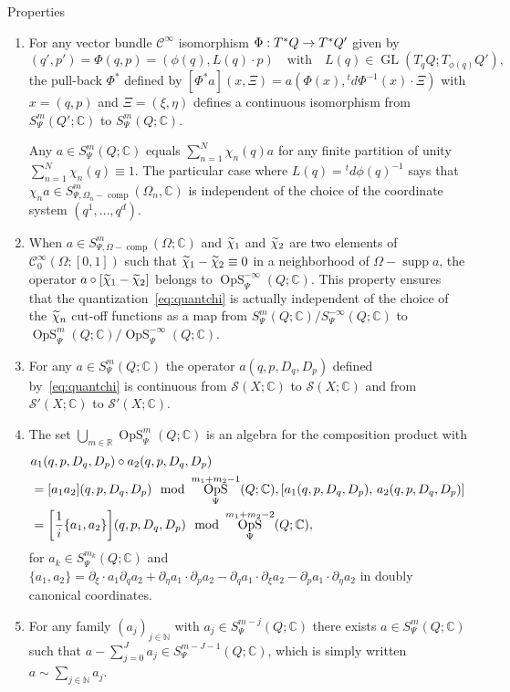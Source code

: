 \documentclass[10pt]{amsart}
\theoremstyle{definition}\newtheorem{defi}[theo]{Definition}\newtheorem{rema}[theo]{Remark}\newtheorem{exam}[theo]{Example}\newtheorem{exem}[theo]{Example}\newtheorem{nota}[theo]{Notation}
\newcommand{\C}{\mathbb{C}}
\newcommand{\R}{\mathbb{R}}
\newcommand{\N}{\mathbb{N}}
\newcommand{\clC}{\mathcal{C}}
\newcommand{\clS}{\mathcal{S}}
\DeclareMathOperator{\OpS}{OpS}
\DeclareMathOperator{\ccomp}{comp}
\DeclareMathOperator{\suppp}{supp}
\DeclareMathOperator{\GL}{GL}
\newcommand*{\relabel}{\renewcommand{\labelenumi}{(\theenumi)}}
\newcommand*{\alphenumi}{\renewcommand*{\theenumi}{\alph{enumi}}\relabel}
\let\oldtilde\tilde
\renewcommand*{\tilde}[1]{\mathchoice{\widetilde{#1}}{\widetilde{#1}}{\oldtilde{#1}}{\oldtilde{#1}}}
\let\originalleft\left
\let\originalright\right
\renewcommand{\left}{\mathopen{}\mathclose\bgroup\originalleft}
\renewcommand{\right}{\aftergroup\egroup\originalright}
\renewcommand*{\to}{\mathchoice{\longrightarrow}{\rightarrow}{\rightarrow}{\rightarrow}}
\newenvironment{enonce*}[2][]{\par\smallskip\noindent\textbf{#2.}\ }{\par\smallskip}
\begin{document}
\begin{enonce*}[remark]{Properties}\leavevmode
\begin{enumerate}\alphenumi
\item\label{propa} For any vector bundle $\clC^{\infty}$ isomorphism $\Phi: T^{*}Q\to T^{*}Q'$ given by
\[
(q',p')=\Phi(q,p)=(\phi(q), L(q)\cdot p)\quad\text{with}\quad L(q)\in \GL (T_{q}Q;T_{\phi(q)}Q'),
\]
the pull-back $\Phi^{*}$ defined by $[\Phi^{*}a](x,\Xi)=a(\Phi(x),{}^{t}d\Phi^{-1}(x)\cdot\Xi)$ with $x=(q,p)$ and $\Xi=(\xi,\eta)$ defines a continuous isomorphism from $S^{m}_{\Psi}(Q';\C)$ to $S^{m}_{\Psi}(Q;\C)$.

Any $a\in S^{m}_{\Psi}(Q;\C)$ equals $\sum_{n=1}^{N}\chi_{n}(q)a$ for any finite partition of unity $\sum_{n=1}^{N}\chi_{n}(q)\equiv 1$. The particular case where $L(q)={}^{t}d\phi(q)^{-1}$ says that $\chi_{n}a\in S^{m}_{\Psi, \Omega_{n}-\ccomp}(\Omega_{n},\C)$ is independent of the choice of the coordinate system $(q^{1},\dots,q^{d})$.

\item\label{propb} When $a\in S^{m}_{\Psi, \Omega-\ccomp}(\Omega;\C)$ and $\tilde{\chi}_{1}$ and $\tilde{\chi}_{2}$ are two elements of $\clC^{\infty}_{0}(\Omega;[0,1])$ such that $\tilde{\chi}_{1}-\tilde{\chi}_{2}\equiv 0$ in a neighborhood of $\Omega-\suppp a$, the operator $a\circ[\tilde{\chi}_{1}-\tilde{\chi}_{2}]$ belongs to $\OpS^{-\infty}_{\Psi}(Q;\C)$. This property ensures that the quantization~\eqref{eq:quantchi} is actually independent of the choice of the $\tilde{\chi}_{n}$ cut-off functions as a map from $S^{m}_{\Psi}(Q;\C)/S^{-\infty}_{\Psi}(Q;\C)$ to $\OpS^{m}_{\Psi}(Q;\C)/\OpS^{-\infty}_{\Psi}(Q;\C)$.
\item\label{propc} For any $a\in S^{m}_{\Psi}(Q;\C)$ the operator $a(q,p,D_{q},D_{p})$ defined by~\eqref{eq:quantchi} is continuous from $\clS(X;\C)$ to $\clS(X;\C)$ and from $\clS'(X;\C)$ to $\clS'(X;\C)$.
\item\label{propd} The set $\bigcup_{m\in \R}\OpS^{m}_{\Psi}(Q;\C)$ is an algebra for the composition product with
\begin{align*}
&a_{1}(q,p,D_{q},D_{p})\circ a_{2}(q,p,D_{q},D_{p})\\
&=[a_{1}a_{2}](q,p,D_{q},D_{p}) \mod \OpS^{m_{1}+m_{2}-1}_{\Psi}(Q;\C),
\left[a_{1}(q,p,D_{q},D_{p}),\, a_{2}(q,p,D_{q},D_{p})\right]
\\
&=\left[\frac{1}{i}\{a_{1},a_{2}\}\right](q,p,D_{q},D_{p})
\mod \OpS^{m_{1}+m_{2}-2}_{\Psi}(Q;\C),
\end{align*}
for $a_{k}\in S^{m_{k}}_{\Psi}(Q;\C)$ and $\{a_{1},a_{2}\}=\partial_{\xi}\cdot a_{1}\partial_{q}a_{2}+\partial_{\eta}a_{1}\cdot\partial_{p}a_{2}-\partial_{q}a_{1}\cdot\partial_{\xi}a_{2}-\partial_{p}a_{1}\cdot\partial_{\eta}a_{2}$ in doubly canonical coordinates.
\item\label{prope} For any family $(a_{j})_{j\in \N}$ with $a_{j}\in S^{m-j}_{\Psi}(Q;\C)$ there exists $a\in S^{m}_{\Psi}(Q;\C)$ such that $a-\sum_{j=0}^{J}a_{j}\in S^{m-J-1}_{\Psi}(Q;\C)$, which is simply written $a\sim \sum_{j\in \N}a_{j}$.


\end{enumerate}
\end{enonce*}
\end{document}
